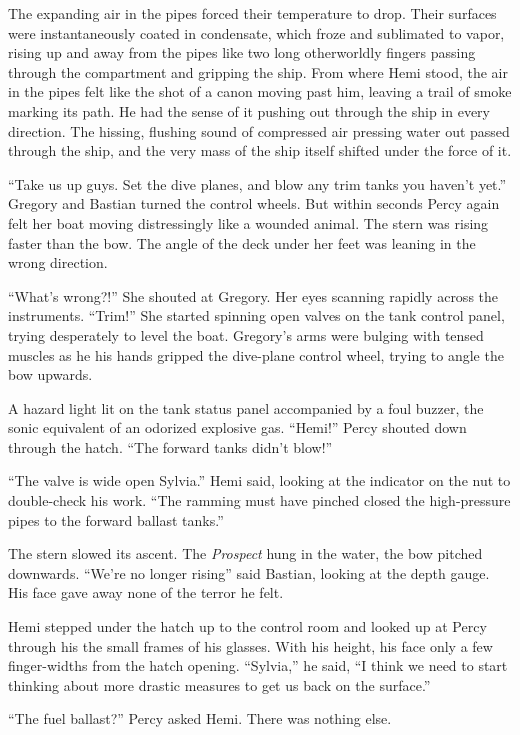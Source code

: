\documentclass[
]{scrbook}
\begin{document}
The expanding air in the pipes forced their temperature to drop. Their
surfaces were instantaneously coated in condensate, which froze and
sublimated to vapor, rising up and away from the pipes like two long
otherworldly fingers passing through the compartment and gripping the
ship. From where Hemi stood, the air in the pipes felt like the shot of
a canon moving past him, leaving a trail of smoke marking its path. He
had the sense of it pushing out through the ship in every direction. The
hissing, flushing sound of compressed air pressing water out passed
through the ship, and the very mass of the ship itself shifted under the
force of it.

``Take us up guys. Set the dive planes, and blow any trim tanks you
haven't yet.'' Gregory and Bastian turned the control wheels. But within
seconds Percy again felt her boat moving distressingly like a wounded
animal. The stern was rising faster than the bow. The angle of the deck
under her feet was leaning in the wrong direction.

``What's wrong?!'' She shouted at Gregory. Her eyes scanning rapidly
across the instruments. ``Trim!'' She started spinning open valves on
the tank control panel, trying desperately to level the boat. Gregory's
arms were bulging with tensed muscles as he his hands gripped the
dive-plane control wheel, trying to angle the bow upwards.

A hazard light lit on the tank status panel accompanied by a foul
buzzer, the sonic equivalent of an odorized explosive gas. ``Hemi!''
Percy shouted down through the hatch. ``The forward tanks didn't blow!''

``The valve is wide open Sylvia.'' Hemi said, looking at the indicator
on the nut to double-check his work. ``The ramming must have pinched
closed the high-pressure pipes to the forward ballast tanks.''

The stern slowed its ascent. The \emph{Prospect} hung in the water, the
bow pitched downwards. ``We're no longer rising'' said Bastian, looking
at the depth gauge. His face gave away none of the terror he felt.

Hemi stepped under the hatch up to the control room and looked up at
Percy through his the small frames of his glasses. With his height, his
face only a few finger-widths from the hatch opening. ``Sylvia,'' he
said, ``I think we need to start thinking about more drastic measures to
get us back on the surface.''

``The fuel ballast?'' Percy asked Hemi. There was nothing else.
\end{document}
